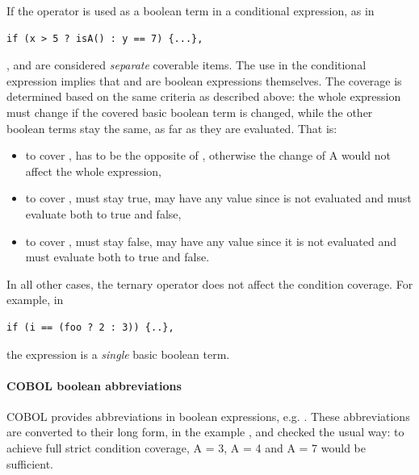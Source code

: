 If the operator is used as a boolean term in a conditional expression, as in
\begin{verbatim}
if (x > 5 ? isA() : y == 7) {...},
\end{verbatim}  
,  and  are considered \emph{separate} coverable items. The use in the conditional expression implies that  and  are boolean expressions themselves. The coverage is determined based on the same criteria as described above: the whole expression must change if the covered basic boolean term is changed, while the other boolean terms stay the same, as far as they are evaluated.  That is:
\begin{itemize}
\item to cover ,  has to be the opposite of , otherwise the change of A would not affect the whole
expression,
\item to cover ,  must stay true,  may have any value since is not evaluated and  must evaluate both to true and false,
\item to cover ,  must stay false,  may have any value since it is not evaluated and  must evaluate both to true and false.
\end{itemize}

In all other cases, the ternary operator does not affect the condition coverage. For example, in 
\begin{verbatim}
if (i == (foo ? 2 : 3)) {..}, 
\end{verbatim}
the expression  is a \emph{single} basic boolean term.

\paragraph{COBOL boolean abbreviations}
COBOL provides abbreviations in boolean expressions, e.g. . These abbreviations are converted to their long form, in the example , and checked the usual way: to achieve full strict condition coverage, A = 3, A = 4 and A = 7 would be sufficient.

